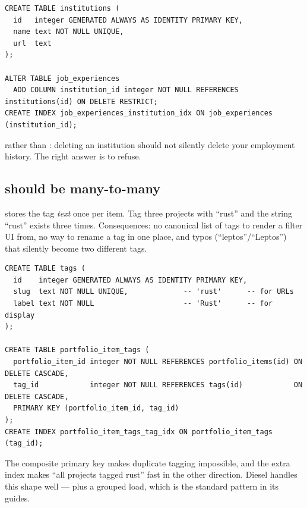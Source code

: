 \begin{pattern}
\begin{lstlisting}[style=sql]
CREATE TABLE institutions (
  id   integer GENERATED ALWAYS AS IDENTITY PRIMARY KEY,
  name text NOT NULL UNIQUE,
  url  text
);

ALTER TABLE job_experiences
  ADD COLUMN institution_id integer NOT NULL REFERENCES institutions(id) ON DELETE RESTRICT;
CREATE INDEX job_experiences_institution_idx ON job_experiences (institution_id);
\end{lstlisting}
 rather than : deleting an institution should not silently
delete your employment history. The right answer is to refuse.
\end{pattern}

\subsection{ should be many-to-many}

 stores the tag \emph{text} once per item. Tag three
projects with ``rust'' and the string ``rust'' exists three times. Consequences: no canonical list
of tags to render a filter UI from, no way to rename a tag in one place, and typos
(``leptos''/``Leptos'') that silently become two different tags.

\begin{pattern}
\begin{lstlisting}[style=sql]
CREATE TABLE tags (
  id    integer GENERATED ALWAYS AS IDENTITY PRIMARY KEY,
  slug  text NOT NULL UNIQUE,             -- 'rust'      -- for URLs
  label text NOT NULL                     -- 'Rust'      -- for display
);

CREATE TABLE portfolio_item_tags (
  portfolio_item_id integer NOT NULL REFERENCES portfolio_items(id) ON DELETE CASCADE,
  tag_id            integer NOT NULL REFERENCES tags(id)            ON DELETE CASCADE,
  PRIMARY KEY (portfolio_item_id, tag_id)
);
CREATE INDEX portfolio_item_tags_tag_idx ON portfolio_item_tags (tag_id);
\end{lstlisting}
The composite primary key makes duplicate tagging impossible, and the extra index makes
``all projects tagged rust'' fast in the other direction. Diesel handles this shape well ---
 plus a grouped load, which is the standard pattern in its guides.
\end{pattern}

